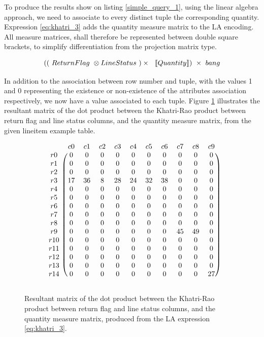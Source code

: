 To produce the results show on listing \ref{simple_query_1}, using the linear algebra approach, we need to associate to every distinct tuple the corresponding quantity. Expression \ref{eq:khatri_3} adds the quantity measure matrix to the LA encoding. All measure matrices, shall therefore be represented between double square brackets,  to simplify differentiation from the projection matrix type.
 
\begin{equation}
\centering
( (\ ReturnFlag\ \otimes LineStatus\ ) \times\ \ \llbracket Quantity \rrbracket )\ \times\ bang
\label{eq:khatri_3}
\end{equation}

In addition to the  association between row number and tuple, with the values 1 and 0 representing the existence or non-existence of the attributes association respectively, we now have a value associated to each tuple. 
Figure \ref{fig:final_matrix_krao_qtt_bang} illustrates the resultant matrix of the dot product between the Khatri-Rao product between return flag and line status columns, and the quantity measure matrix, from the given lineitem example table.


\begin{figure}[H]
\centering
\caption{Resultant matrix of the dot product between the Khatri-Rao product between return flag and line status columns, and the quantity measure matrix, produced from the LA expression \ref{eq:khatri_3}.}
\[
\begin{blockarray}{ccccccccccc}
		& c	0	& c	1	& c	2	& c	3	& c	4	& c	5	& c	6	& c	7	& c	8	& c	9	\\
\begin{block}{c(cccccccccc)}
r	0	&	0	&	0	&	0	&	0	&	0	&	0	&	0	&	0	&	0	&	0	\\
r	1	&	0	&	0	&	0	&	0	&	0	&	0	&	0	&	0	&	0	&	0	\\
r	2	&	0	&	0	&	0	&	0	&	0	&	0	&	0	&	0	&	0	&	0	\\
r	3	&	17	&	36	&	8	&	28	&	24	&	32	&	38	&	0	&	0	&	0	\\
r	4	&	0	&	0	&	0	&	0	&	0	&	0	&	0	&	0	&	0	&	0	\\
r	5	&	0	&	0	&	0	&	0	&	0	&	0	&	0	&	0	&	0	&	0	\\
r	6	&	0	&	0	&	0	&	0	&	0	&	0	&	0	&	0	&	0	&	0	\\
r	7	&	0	&	0	&	0	&	0	&	0	&	0	&	0	&	0	&	0	&	0	\\
r	8	&	0	&	0	&	0	&	0	&	0	&	0	&	0	&	0	&	0	&	0	\\
r	9	&	0	&	0	&	0	&	0	&	0	&	0	&	0	&	45	&	49	&	0	\\
r	10	&	0	&	0	&	0	&	0	&	0	&	0	&	0	&	0	&	0	&	0	\\
r	11	&	0	&	0	&	0	&	0	&	0	&	0	&	0	&	0	&	0	&	0	\\
r	12	&	0	&	0	&	0	&	0	&	0	&	0	&	0	&	0	&	0	&	0	\\
r	13	&	0	&	0	&	0	&	0	&	0	&	0	&	0	&	0	&	0	&	0	\\
r	14	&	0	&	0	&	0	&	0	&	0	&	0	&	0	&	0	&	0	&	27	\\
\end{block}
\end{blockarray}
\]
\label{fig:final_matrix_krao_qtt_bang}
\end{figure}


